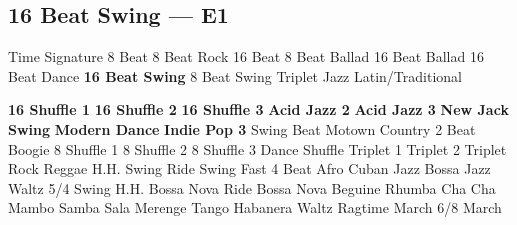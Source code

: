 \subsection{16 Beat Swing --- \UiKey{\II}\UiKey{\MET}E1}
Time Signature
8 Beat
8 Beat Rock
16 Beat
8 Beat Ballad
16 Beat Ballad
16 Beat Dance
\textbf{16 Beat Swing}
8 Beat Swing
Triplet
Jazz
Latin/Traditional





























\textbf{16 Shuffle 1}
\textbf{16 Shuffle 2}
\textbf{16 Shuffle 3}
\textbf{Acid Jazz 2}
\textbf{Acid Jazz 3}
\textbf{New Jack Swing}
\textbf{Modern Dance}
\textbf{Indie Pop 3}
Swing Beat
Motown
Country 2 Beat
Boogie
8 Shuffle 1
8 Shuffle 2
8 Shuffle 3
Dance Shuffle
Triplet 1
Triplet 2
Triplet Rock
Reggae
H.H. Swing
Ride Swing
Fast 4 Beat
Afro Cuban
Jazz Bossa
Jazz Waltz
5/4 Swing
H.H. Bossa Nova
Ride Bossa Nova
Beguine
Rhumba
Cha Cha
Mambo
Samba
Sala
Merenge
Tango
Habanera
Waltz
Ragtime
March
6/8 March
